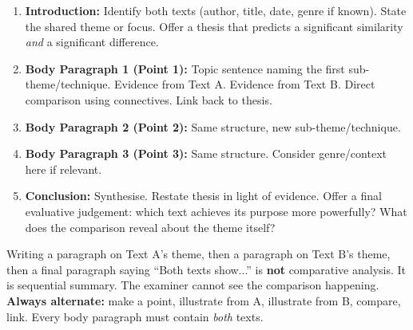 \documentclass[11pt]{article}
\begin{document}
\begin{methode}
\begin{enumerate}
\item \textbf{Introduction:} Identify both texts (author, title, date, genre if known). State the shared theme or focus. Offer a thesis that predicts a significant similarity \emph{and} a significant difference.
\item \textbf{Body Paragraph 1 (Point 1):} Topic sentence naming the first sub-theme/technique. Evidence from Text A. Evidence from Text B. Direct comparison using connectives. Link back to thesis.
\item \textbf{Body Paragraph 2 (Point 2):} Same structure, new sub-theme/technique.
\item \textbf{Body Paragraph 3 (Point 3):} Same structure. Consider genre/context here if relevant.
\item \textbf{Conclusion:} Synthesise. Restate thesis in light of evidence. Offer a final evaluative judgement: which text achieves its purpose more powerfully? What does the comparison reveal about the theme itself?
\end{enumerate}
\end{methode}

\begin{attention}
Writing a paragraph on Text A's theme, then a paragraph on Text B's theme, then a final paragraph saying ``Both texts show...'' is \textbf{not} comparative analysis. It is sequential summary. The examiner cannot see the comparison happening. \textbf{Always alternate:} make a point, illustrate from A, illustrate from B, compare, link. Every body paragraph must contain \emph{both} texts.
\end{attention}
\end{document}
